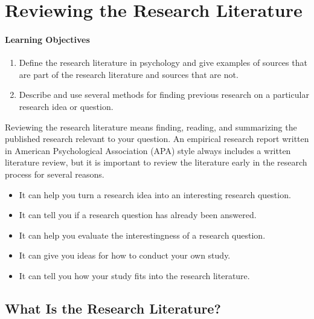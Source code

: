 \newpage
\section{Reviewing the Research Literature}

\paragraph{Learning Objectives}
\begin{enumerate}
\item Define the research literature in psychology and give examples of sources that are part of the research literature and sources that are not.
\item Describe and use several methods for finding previous research on a particular research idea or question.
\end{enumerate}


Reviewing the research literature means finding, reading, and summarizing the published research relevant to your question. An empirical research report written in American Psychological Association (APA) style always includes a written literature review, but it is important to review the literature early in the research process for several reasons.

\begin{itemize}
\item It can help you turn a research idea into an interesting research question.
\item It can tell you if a research question has already been answered.
\item It can help you evaluate the interestingness of a research question.
\item It can give you ideas for how to conduct your own study.
\item It can tell you how your study fits into the research literature.
\end{itemize}

\subsection{What Is the Research Literature?}

